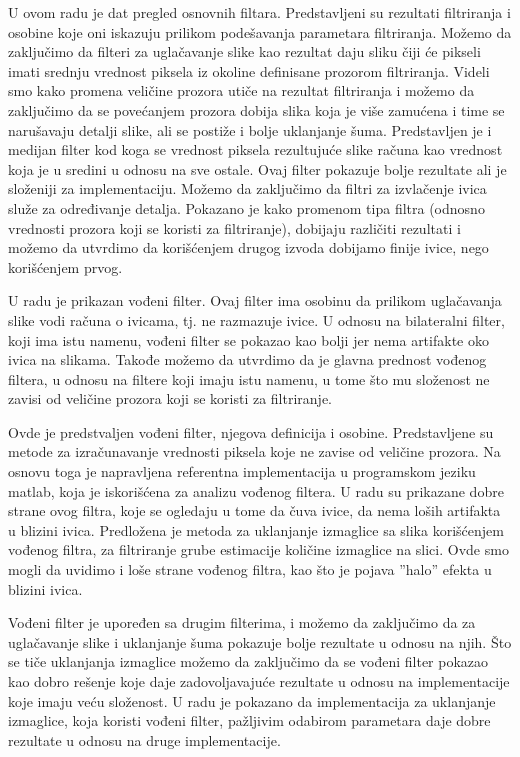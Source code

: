 \documentclass[a4paper,12pt,titlepage]{article}
\begin{document}
U ovom radu je dat pregled osnovnih filtara. Predstavljeni su rezultati filtriranja i osobine koje oni iskazuju prilikom podešavanja parametara filtriranja. Možemo da zaključimo da filteri za uglačavanje slike kao rezultat daju sliku čiji će pikseli imati srednju vrednost piksela iz okoline definisane prozorom filtriranja. Videli smo kako promena veličine prozora utiče na rezultat filtriranja i možemo da zaključimo da se povećanjem prozora dobija slika koja je više zamućena i time se narušavaju detalji slike, ali se postiže i bolje uklanjanje šuma. Predstavljen je i medijan filter kod koga se vrednost piksela rezultujuće slike računa kao vrednost koja je u sredini u odnosu na sve ostale. Ovaj filter pokazuje bolje rezultate ali je složeniji za implementaciju. Možemo da zaključimo da filtri za izvlačenje ivica služe za određivanje detalja. Pokazano je kako promenom tipa filtra (odnosno vrednosti prozora koji se koristi za filtriranje), dobijaju različiti rezultati i možemo da utvrdimo da korišćenjem drugog izvoda dobijamo finije ivice, nego korišćenjem prvog.

U radu je prikazan vođeni filter. Ovaj filter ima osobinu da prilikom uglačavanja slike vodi računa o ivicama, tj. ne razmazuje ivice. U odnosu na bilateralni filter, koji ima istu namenu, vođeni filter se pokazao kao bolji jer nema artifakte oko ivica na slikama. Takođe možemo da utvrdimo da je glavna prednost vođenog filtera, u odnosu na filtere koji imaju istu namenu, u tome što mu složenost ne zavisi od veličine prozora koji se koristi za filtriranje. 

Ovde je predstvaljen vođeni filter, njegova definicija i osobine. Predstavljene su metode za izračunavanje vrednosti piksela koje ne zavise od veličine prozora. Na osnovu toga je napravljena referentna implementacija u programskom jeziku matlab, koja je iskorišćena za analizu vođenog filtera. U radu su prikazane dobre strane ovog filtra, koje se ogledaju u tome da čuva ivice, da nema loših artifakta u blizini ivica. Predložena je metoda za uklanjanje izmaglice sa slika korišćenjem vođenog filtra, za filtriranje grube estimacije količine izmaglice na slici. Ovde smo mogli da uvidimo i loše strane vođenog filtra, kao što je pojava ''halo'' efekta u blizini ivica. 

Vođeni filter je upoređen sa drugim filterima, i možemo da zaključimo da za uglačavanje slike i uklanjanje šuma pokazuje bolje rezultate u odnosu na njih. Što se tiče uklanjanja izmaglice možemo da zaključimo da se vođeni filter pokazao kao dobro rešenje koje daje zadovoljavajuće rezultate u odnosu na implementacije koje imaju veću složenost. U radu je pokazano da implementacija za uklanjanje izmaglice, koja koristi vođeni filter, pažljivim odabirom parametara daje dobre rezultate u odnosu na druge implementacije.
\end{document}
